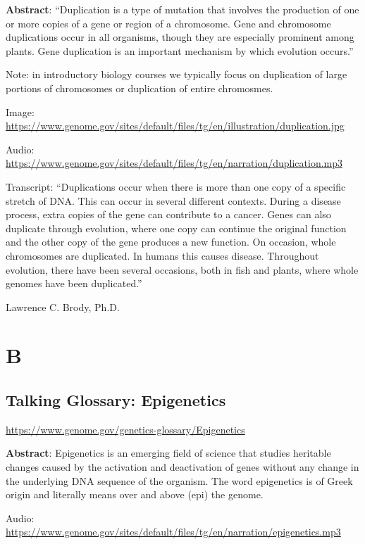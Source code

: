 \documentclass[
]{book}
\begin{document}
\textbf{Abstract}: ``Duplication is a type of mutation that involves the production of one or more copies of a gene or region of a chromosome. Gene and chromosome duplications occur in all organisms, though they are especially prominent among plants. Gene duplication is an important mechanism by which evolution occurs.''

Note: in introductory biology courses we typically focus on duplication of large portions of chromosomes or duplication of entire chromosmes.

Image: \url{https://www.genome.gov/sites/default/files/tg/en/illustration/duplication.jpg}

Audio: \url{https://www.genome.gov/sites/default/files/tg/en/narration/duplication.mp3}

Transcript: ``Duplications occur when there is more than one copy of a specific stretch of DNA. This can occur in several different contexts. During a disease process, extra copies of the gene can contribute to a cancer. Genes can also duplicate through evolution, where one copy can continue the original function and the other copy of the gene produces a new function. On occasion, whole chromosomes are duplicated. In humans this causes disease. Throughout evolution, there have been several occasions, both in fish and plants, where whole genomes have been duplicated.''

Lawrence C. Brody, Ph.D.

\hypertarget{b-1}{%
\chapter{B}\label{b-1}}

\hypertarget{talking-glossary-epigenetics}{%
\section{Talking Glossary: Epigenetics}\label{talking-glossary-epigenetics}}

\url{https://www.genome.gov/genetics-glossary/Epigenetics}

\textbf{Abstract}: Epigenetics is an emerging field of science that studies heritable changes caused by the activation and deactivation of genes without any change in the underlying DNA sequence of the organism. The word epigenetics is of Greek origin and literally means over and above (epi) the genome.

Audio: \url{https://www.genome.gov/sites/default/files/tg/en/narration/epigenetics.mp3}
\end{document}
